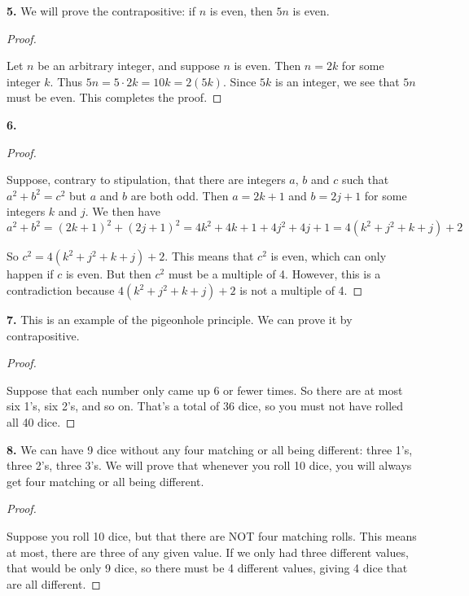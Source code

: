 \documentclass[10pt,]{book}
\theoremstyle{plain}
\theoremstyle{definition}
\theoremstyle{definition}
\theoremstyle{definition}
\numberwithin{equation}{chapter}
\begin{document}
\par\smallskip
\noindent\textbf{5.}\quad{}
We will prove the contrapositive: if \(n\) is even, then \(5n\) is even.
%
\begin{proof}\hypertarget{proof-45}{}

Let \(n\) be an arbitrary integer, and suppose \(n\) is even. Then \(n = 2k\) for some integer \(k\). Thus \(5n = 5\cdot 2k = 10k = 2(5k)\). Since \(5k\) is an integer, we see that \(5n\) must be even. This completes the proof.
%
\end{proof}
\par\smallskip
\noindent\textbf{6.}\quad{}\begin{proof}\hypertarget{proof-46}{}

Suppose, contrary to stipulation, that there are integers \(a\), \(b\) and \(c\) such that \(a^2 + b^2 = c^2\) but \(a\) and \(b\) are both odd. Then \(a = 2k+1\) and \(b = 2j + 1\) for some integers \(k\) and \(j\). We then have
\begin{equation*}
  a^2 + b^2 = (2k+1)^2 + (2j+1)^2 = 4k^2 + 4k + 1 + 4j^2 + 4j + 1 = 4(k^2 + j^2 + k + j) + 2
\end{equation*}
%
\par

So \(c^2 = 4(k^2 + j^2 + k + j) + 2\). This means that \(c^2\) is even, which can only happen if \(c\) is even. But then \(c^2\) must be a multiple of 4. However, this is a contradiction because \(4(k^2 + j^2 + k + j) + 2\) is not a multiple of 4.
%
\end{proof}
\par\smallskip
\noindent\textbf{7.}\quad{}
This is an example of the pigeonhole principle. We can prove it by contrapositive.
%
\begin{proof}\hypertarget{proof-47}{}

Suppose that each number only came up 6 or fewer times. So there are at most six 1's, six 2's, and so on. That's a total of 36 dice, so you must not have rolled all 40 dice.
%
\end{proof}
\par\smallskip
\noindent\textbf{8.}\quad{}
We can have 9 dice without any four matching or all being different: three 1's, three 2's, three 3's. We will prove that whenever you roll 10 dice, you will always get four matching or all being different.
%
\begin{proof}\hypertarget{proof-48}{}

Suppose you roll 10 dice, but that there are NOT four matching rolls. This means at most, there are three of any given value. If we only had three different values, that would be only 9 dice, so there must be 4 different values, giving 4 dice that are all different.
%
\end{proof}
\end{document}

